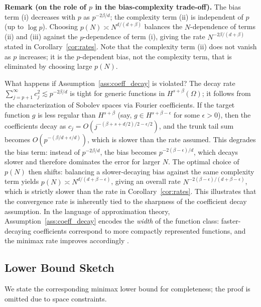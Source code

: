 \documentclass[12pt,a4paper]{article}
\begin{document}
\textbf{Remark (on the role of $p$ in the bias-complexity trade-off).}
The bias term (i) decreases with $p$ as $p^{-2\beta/d}$;
the complexity term (ii) is independent of $p$ (up to $\log p$).
Choosing $p(N) \asymp N^{d/(d+\beta)}$ balances the $N$-dependence of
terms (ii) and (iii) against the $p$-dependence of term (i),
giving the rate $N^{-2\beta/(d+\beta)}$ stated in
Corollary~\ref{cor:rates}.  Note that the complexity term (ii) does not
vanish as $p$ increases; it is the $p$-dependent bias, not the
complexity term, that is eliminated by choosing large $p(N)$.

What happens if Assumption~\ref{ass:coeff_decay} is violated?  The decay rate
$\sum_{j=p+1}^\infty c_j^2 \lesssim p^{-2\beta/d}$ is tight for generic functions
in $H^{s+\beta}(\Omega)$; it follows from the characterization of Sobolev spaces
via Fourier coefficients.  If the target function $g$ is less regular than
$H^{s+\beta}$ (say, $g \in H^{s+\beta-\epsilon}$ for some $\epsilon > 0$), then the
coefficients decay as $c_j = O(j^{-(\beta+s+d/2)/2 - \epsilon/2})$, and the trunk
tail sum becomes $O(p^{-(\beta/d + \epsilon/d)})$, which is slower than the rate
assumed.  This degrades the bias term: instead of $p^{-2\beta/d}$, the bias becomes
$p^{-2(\beta-\epsilon)/d}$, which decays slower and therefore dominates the error
for larger $N$.  The optimal choice of $p(N)$ then shifts: balancing a slower-decaying
bias against the same complexity term yields $p(N) \asymp N^{d/(d+\beta-\epsilon)}$,
giving an overall rate $N^{-2(\beta-\epsilon)/(d+\beta-\epsilon)}$, which is strictly
slower than the rate in Corollary~\ref{cor:rates}.  This illustrates that the
convergence rate is inherently tied to the sharpness of the coefficient decay
assumption.  In the language of approximation theory, Assumption~\ref{ass:coeff_decay}
encodes the \emph{width} of the function class: faster-decaying coefficients
correspond to more compactly represented functions, and the minimax rate improves
accordingly \citep{cohen2020approximation,chkifa2014sparse}.

\subsection{Lower Bound Sketch}
\label{sec:lower}

We state the corresponding minimax lower bound for completeness;
the proof is omitted due to space constraints.
\end{document}
